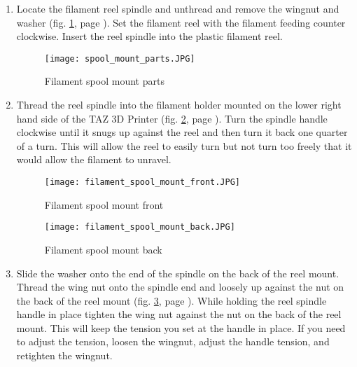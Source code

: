 \begin{enumerate}

\item Locate the filament reel spindle and unthread and remove the wingnut and washer (fig. \ref{fig:spool_mount_parts}, page \pageref{fig:spool_mount_parts}). Set the filament reel with the filament feeding counter clockwise. Insert the reel spindle into the plastic filament reel.

\begin{figure}[H]
\centering
\texttt{[image: spool\_mount\_parts.JPG]}
\caption{Filament spool mount parts}
\label{fig:spool_mount_parts}
\end{figure}

\item Thread the reel spindle into the filament holder mounted on the lower right hand side of the TAZ 3D Printer (fig. \ref{fig:filament_spool_mount_front}, page \pageref{fig:filament_spool_mount_front}). Turn the spindle handle clockwise until it snugs up against the reel and then turn it back one quarter of a turn. This will allow the reel to easily turn but not turn too freely that it would allow the filament to unravel.

\begin{figure}[hp]
\centering
\texttt{[image: filament\_spool\_mount\_front.JPG]}
\caption{Filament spool mount front}
\label{fig:filament_spool_mount_front}
\end{figure}

\begin{figure}[hp]
\centering
\texttt{[image: filament\_spool\_mount\_back.JPG]}
\caption{Filament spool mount back}
\label{fig:filament_spool_mount_back}
\end{figure}

\item Slide the washer onto the end of the spindle on the back of the reel mount. Thread the wing nut onto the spindle end and loosely up against the nut on the back of the reel mount (fig. \ref{fig:filament_spool_mount_back}, page \pageref{fig:filament_spool_mount_back}). While holding the reel spindle handle in place tighten the wing nut against the nut on the back of the reel mount. This will keep the tension you set at the handle in place. If you need to adjust the tension, loosen the wingnut, adjust the handle tension, and retighten the wingnut.


\end{enumerate}
